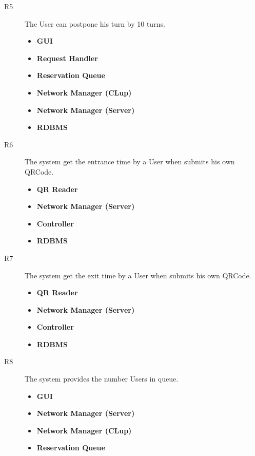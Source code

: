 \begin{description}
   
   \item[R5] The User can postpone his turn by 10 turns.
        \begin{itemize}
            \item \textbf{GUI}
            \item \textbf{Request Handler}
            \item \textbf{Reservation Queue}
            \item \textbf{Network Manager (CLup)}
            \item \textbf{Network Manager (Server)}
            \item \textbf{RDBMS}
        \end{itemize}
    
    
    \item[R6] The system get the entrance time by a User when submits his own      QRCode.
        \begin{itemize}
            \item \textbf{QR Reader}
            \item \textbf{Network Manager (Server)}
            \item \textbf{Controller}
            \item \textbf{RDBMS}
        \end{itemize}
    
    
    
\item[R7] The system get the exit time by a User when submits his own QRCode.
    \begin{itemize}
        \item \textbf{QR Reader}
        \item \textbf{Network Manager (Server)}
        \item \textbf{Controller}
        \item \textbf{RDBMS}
    \end{itemize}
    
    
\item[R8] The system provides the number Users in queue.%
    \begin{itemize}
        \item \textbf{GUI}
        \item \textbf{Network Manager (Server)}
        \item \textbf{Network Manager (CLup)}
        \item \textbf{Reservation Queue}
    \end{itemize}


\end{description}
